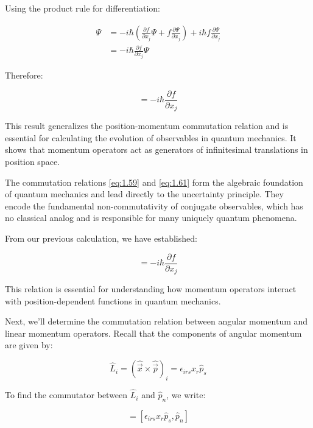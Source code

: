 \documentclass[italian]{HKNdocument}
\begin{document}
Using the product rule for differentiation:

\begin{align}
[\hat{p}_j, f]\Psi &= -i\hbar\left(\frac{\partial f}{\partial x_j}\Psi + f\frac{\partial\Psi}{\partial x_j}\right) + i\hbar f\frac{\partial\Psi}{\partial x_j} \label{eq:1.61} \\
&= -i\hbar\frac{\partial f}{\partial x_j}\Psi
\end{align}

Therefore:

\begin{equation}
[\hat{p}_j, f] = -i\hbar\frac{\partial f}{\partial x_j}
\end{equation}

This result generalizes the position-momentum commutation relation and is essential for calculating the evolution of observables in quantum mechanics. It shows that momentum operators act as generators of infinitesimal translations in position space.

The commutation relations \eqref{eq:1.59} and \eqref{eq:1.61} form the algebraic foundation of quantum mechanics and lead directly to the uncertainty principle. They encode the fundamental non-commutativity of conjugate observables, which has no classical analog and is responsible for many uniquely quantum phenomena.


From our previous calculation, we have established:

\begin{equation}
[\hat{p}_j, f] = -i\hbar\frac{\partial f}{\partial x_j}
\end{equation}

This relation is essential for understanding how momentum operators interact with position-dependent functions in quantum mechanics.

Next, we'll determine the commutation relation between angular momentum and linear momentum operators. Recall that the components of angular momentum are given by:

\begin{equation}
\hat{L}_i = (\hat{\vec{x}} \times \hat{\vec{p}})_i = \epsilon_{irs}x_r\hat{p}_s
\end{equation}

To find the commutator between $\hat{L}_i$ and $\hat{p}_n$, we write:

\begin{equation}
[\hat{L}_i, \hat{p}_n] = [\epsilon_{irs}x_r\hat{p}_s, \hat{p}_n]
\end{equation}
\end{document}
